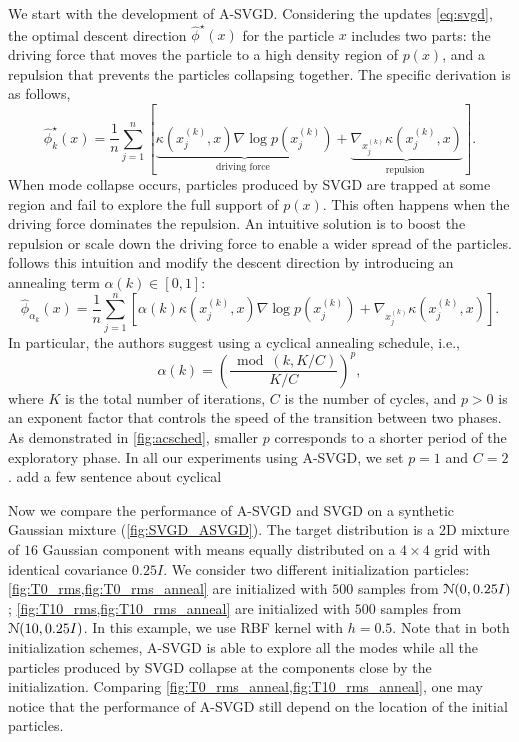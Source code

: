 We start with the development of A-SVGD. Considering the updates \cref{eq:svgd}, the optimal descent direction $ \hat{\phi}^{\star}(x)$ for the particle $x$ includes two parts: the driving force that moves the particle to a high density region of $p(x)$, and a repulsion that prevents the particles collapsing together. The specific derivation is as follows,
\[
    \hat{\phi}_k^{\star}(x)=\frac{1}{n} \sum_{j=1}^{n}\left[\underbrace{\kappa\left(x_{j}^{(k)}, x\right) \nabla \log p\left(x_{j}^{(k)}\right)}_{\text {driving force }}+\underbrace{\nabla_{x_{j}^{(k)}} \kappa\left(x_{j}^{(k)}, x\right)}_{\text {repulsion }}\right].
\]
When mode collapse occurs, particles produced by SVGD are trapped at some region and fail to explore the full support of $p(x)$. This often happens when the driving force dominates the repulsion. An intuitive solution is to boost the repulsion or scale down the driving force to enable a wider spread of the particles. 
\citet{d2021annealed} follows this intuition and modify the descent direction by introducing an annealing term $\alpha(k) \in [0, 1]$:
\[\label{eq:asvgd}
    \hat{\phi}_{\alpha_k}\left(x\right) = \frac{1}{n} \sum_{j=1}^{n}\left[ \alpha(k)\kappa\left(x_{j}^{(k)}, x\right) \nabla \log p\left(x_{j}^{(k)}\right)+ \nabla_{x_{j}^{(k)}} \kappa\left(x_{j}^{(k)}, x\right)\right].
\]
In particular, the authors suggest using a cyclical annealing schedule, i.e., 
\[
    \alpha(k)=\left(\frac{\bmod (k, K / C)}{K / C}\right)^{p},
\]
where $K$ is the total number of iterations, $C$ is the number of cycles, and $p > 0$ is an exponent factor that controls the speed of the transition between two phases. As demonstrated in \cref{fig:acsched}, smaller $p$ corresponds to a shorter period of the exploratory phase.  In all our experiments using A-SVGD, we set $ p = 1$ and $C = 2$. {\color{red} add a few sentence about cyclical }

Now we compare the performance of A-SVGD and SVGD on a synthetic Gaussian mixture (\cref{fig:SVGD_ASVGD}). The target distribution is a 2D mixture of $16$ Gaussian component with means equally distributed on a $4 \times 4$ grid with identical covariance $0.25I$.  We consider two different initialization particles: \cref{fig:T0_rms,fig:T0_rms_anneal} are initialized with $500$ \iid samples from $\mathcal{N}(0, 0.25I)$; \cref{fig:T10_rms,fig:T10_rms_anneal} are initialized with $500$ \iid samples from $\mathcal{N}(10, 0.25I)$. In this example, we use RBF kernel with $h = 0.5$. Note that in both initialization schemes, A-SVGD is able to explore all the modes 
while all the particles produced by SVGD collapse at the components close by the initialization. Comparing \cref{fig:T0_rms_anneal,fig:T10_rms_anneal}, one may notice that the performance of A-SVGD still depend on the location of the initial particles. 

